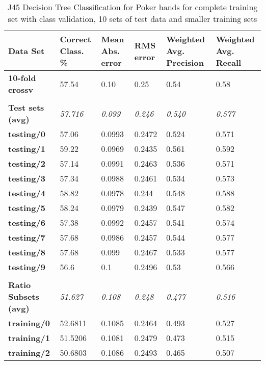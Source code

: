 \documentclass[10pt, a4paper]{article}
\begin{document}
\begin{table}[htbp]
  \centering
  \begin{tabular}{p{3cm}p{1.5cm}p{1.5cm}p{1.5cm}p{1.5cm}p{1.5cm}}
    \toprule
    \textbf{Data Set} & Correct Class. \% & Mean Abs. error & RMS error & Weighted Avg. Precision & Weighted Avg. Recall \\
    \midrule
    \textbf{10-fold crossv} & 57.54 & 0.10  & 0.25  & 0.54  & 0.58 \\
    \textbf{} &       &       &       &       &  \\
    \textbf{Test sets (avg)} & \textit{57.716} & \textit{0.099} & \textit{0.246} & \textit{0.540} & \textit{0.577} \\
    \textbf{   testing/0} & 57.06 & 0.0993 & 0.2472 & 0.524 & 0.571 \\
    \textbf{   testing/1} & 59.22 & 0.0969 & 0.2435 & 0.561 & 0.592 \\
    \textbf{   testing/2} & 57.14 & 0.0991 & 0.2463 & 0.536 & 0.571 \\
    \textbf{   testing/3} & 57.34 & 0.0988 & 0.2461 & 0.534 & 0.573 \\
    \textbf{   testing/4} & 58.82 & 0.0978 & 0.244 & 0.548 & 0.588 \\
    \textbf{   testing/5} & 58.24 & 0.0979 & 0.2439 & 0.547 & 0.582 \\
    \textbf{   testing/6} & 57.38 & 0.0992 & 0.2457 & 0.541 & 0.574 \\
    \textbf{   testing/7} & 57.68 & 0.0986 & 0.2457 & 0.544 & 0.577 \\
    \textbf{   testing/8} & 57.68 & 0.099 & 0.2467 & 0.533 & 0.577 \\
    \textbf{   testing/9} & 56.6  & 0.1   & 0.2496 & 0.53  & 0.566 \\
    \textbf{} &       &       &       &       &  \\
    \textbf{Ratio Subsets (avg)} & \textit{51.627} & \textit{0.108} & \textit{0.248} & \textit{0.477} & \textit{0.516} \\
    \textbf{   training/0} & 52.6811 & 0.1085 & 0.2464 & 0.493 & 0.527 \\
    \textbf{   training/1} & 51.5206 & 0.1081 & 0.2479 & 0.473 & 0.515 \\
    \textbf{   training/2} & 50.6803 & 0.1086 & 0.2493 & 0.465 & 0.507 \\
    \bottomrule
    \end{tabular}%


\caption{J45 Decision Tree Classification for Poker hands for complete training set with class validation, 10 sets of test data and smaller training sets}   
  \label{tab:dtresults}%
\end{table}%
\end{document}
